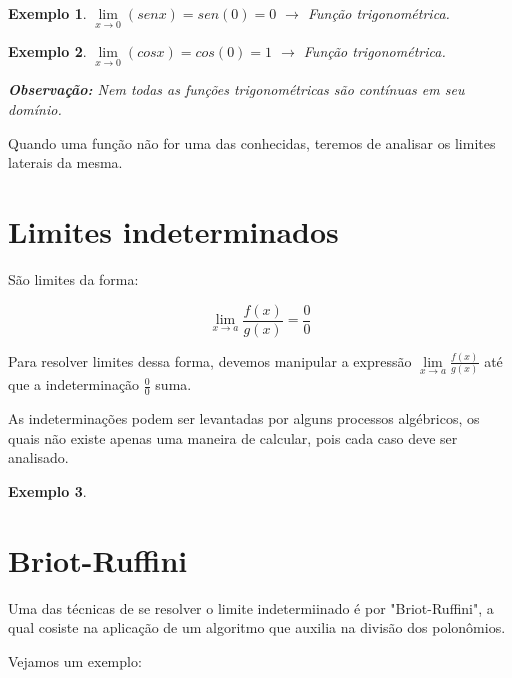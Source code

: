 \documentclass{book}
\numberwithin{defn}{chapter}
\newtheorem{exe}{Exemplo}
\numberwithin{exe}{chapter}
\numberwithin{ex}{chapter}
\numberwithin{obs}{chapter}
\numberwithin{fato}{chapter}
\numberwithin{resp}{chapter}
\begin{document}
\begin{exe}
    $\lim\limits_{x\to 0}(sen x) = sen(0)=0$ $\rightarrow$ Função trigonométrica.
\end{exe}

\begin{exe}
    $\lim\limits_{x\to 0}(cos x) = cos(0)=1$ $\rightarrow$ Função trigonométrica.

\item\textbf{Observação:} Nem todas as funções trigonométricas são contínuas em seu domínio.
\end{exe}

Quando uma função não for uma das conhecidas, teremos de analisar os limites laterais da mesma.



\section{Limites indeterminados} 
São limites da forma:

\[\lim\limits_{x\to a}\frac{f(x)}{g(x)}=\frac{0}{0}\]

Para resolver limites dessa forma, devemos manipular a expressão $\lim\limits_{x\to a}\frac{f(x)}{g(x)}$ até que a indeterminação $\frac{0}{0}$ suma.

As indeterminações podem ser levantadas por alguns processos algébricos, os quais não existe apenas uma maneira de calcular, pois cada caso deve ser analisado.

\begin{exe}
\end{exe}

\section{Briot-Ruffini}
\text{ }

Uma das técnicas de se resolver o limite indetermiinado é por "Briot-Ruffini", a qual cosiste na aplicação de um algoritmo que auxilia na divisão dos polonômios.

Vejamos um exemplo:
\end{document}
